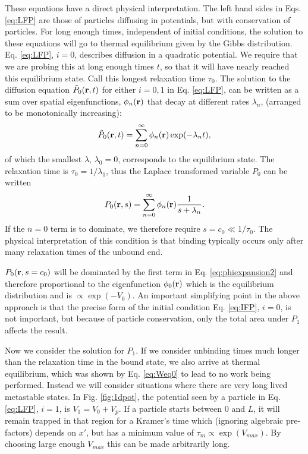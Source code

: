\documentclass[11pt]{ucthesis}
\def\br{{\bf r}}
\begin{document}
These equations have a direct physical interpretation. The left hand sides in
Eqs. \ref{eq:LFP} are those of particles diffusing in potentials, but with
conservation of particles. For long enough times, independent of initial
conditions, the solution to these equations will go to thermal equilibrium given
by the Gibbs distribution. 
Eq. \ref{eq:LFP}, $i=0$,  describes diffusion in a quadratic potential. We require that
we are probing this at long enough times $t$, so that it will have nearly
reached this equilibrium state. Call this longest relaxation time $\tau_0$.
The solution to the diffusion equation $\tilde{P}_0(\br,t)$ for either $i=0,1$ in Eq.
\ref{eq:LFP}, can be written as a sum over spatial
eigenfunctions, $\phi_n(\br)$ that decay at different rates $\lambda_n$,
(arranged to be monotonically increasing):
\begin{equation}
\label{eq:phiexpansion1}
\tilde{P}_0(\br,t) = \sum_{n=0}^\infty \phi_n(\br) \exp(-\lambda_n t), 
\end{equation}
of which the smallest $\lambda$, $\lambda_0 = 0$, corresponds to the equilibrium state. The relaxation
time is $\tau_0 = 1/\lambda_1$, thus the Laplace
transformed variable $P_0$ can be written
\begin{equation}
\label{eq:phiexpansion2}
P_0(\br,s) = \sum_{n=0}^\infty \phi_n(\br) \frac{1}{s+\lambda_n} .
\end{equation}
If the $n=0$ term is to dominate, we therefore require $s = c_0 \ll 1/\tau_0$.
The physical interpretation of this condition is that binding typically occurs only after
many relaxation times of the unbound end.

$P_0(\br, s=c_0)$ will be dominated by the first term in Eq. \ref{eq:phiexpansion2}
and therefore proportional to the eigenfunction $\phi_0(\br)$ which is
the equilibrium distribution and is $\propto \exp(-V_0)$.
An important simplifying point in the above approach is that the precise form of
the initial condition Eq. \ref{eq:IFP}, $i=0$, is not important, but because of
particle conservation, only the total area under $P_1$ affects the result.


Now we consider the solution for $P_1$. If we consider unbinding times much
longer than the relaxation time in the bound state, we also arrive at thermal
equilibrium, which was shown by Eq. \ref{eq:Weq0} to lead to no work being performed. Instead
we will consider situations where there are very long lived metastable states.
In Fig. \ref{fig:1dpot}, the potential seen by a particle in Eq. \ref{eq:LFP}, $i=1$,
is $V_1 = V_0 + V_p$. If a particle starts between $0$ and $L$, it will remain
trapped in that region for a Kramer's time which (ignoring algebraic pre-factors)
depends on $x'$, but has a minimum value of $\tau_m \propto \exp(V_{max})$. By
choosing large enough $V_{max}$ this can be made arbitrarily long. 
\end{document}
